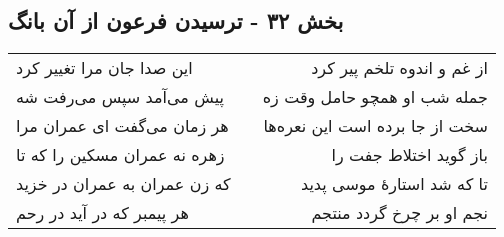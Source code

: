 \begin{center}
\section*{بخش ۳۲ - ترسیدن فرعون از آن بانگ}
\label{sec:sh032}
\begin{longtable}{l p{0.5cm} r}
این صدا جان مرا تغییر کرد
&&
از غم و اندوه تلخم پیر کرد
\\
پیش می‌آمد سپس می‌رفت شه
&&
جمله شب او همچو حامل وقت زه
\\
هر زمان می‌گفت ای عمران مرا
&&
سخت از جا برده است این نعره‌ها
\\
زهره نه عمران مسکین را که تا
&&
باز گوید اختلاط جفت را
\\
که زن عمران به عمران در خزید
&&
تا که شد استارهٔ موسی پدید
\\
هر پیمبر که در آید در رحم
&&
نجم او بر چرخ گردد منتجم
\\
\end{longtable}
\end{center}
